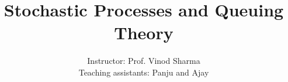 \documentclass[oneside,a4paper,10pt,english]{book}
\title{Stochastic Processes and Queuing Theory}
\author{Instructor: Prof. Vinod Sharma \\ Teaching assistants: Panju and Ajay}
\newcommand{\onlyinsubfile}[1]{#1}
\newcommand{\notinsubfile}[1]{}
\begin{document}
\renewcommand{\onlyinsubfile}[1]{}
\renewcommand{\notinsubfile}[1]{#1}
\maketitle
\tableofcontents

\newpage

\newpage

\newpage

\newpage

\newpage

\newpage

\newpage

\newpage

\newpage

\newpage

\newpage

\newpage

\newpage

\newpage

\newpage

\newpage

\newpage

\newpage

\newpage

\newpage

\newpage

\newpage

\newpage

\newpage

\newpage

\newpage

\newpage

\end{document}
